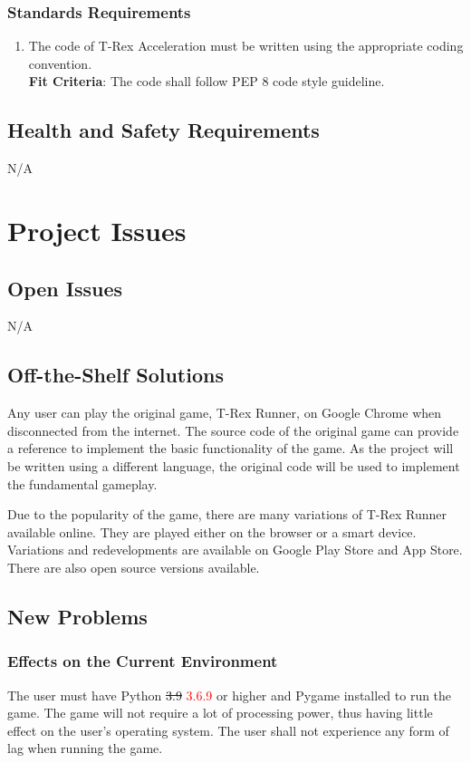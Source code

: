 \documentclass[12pt, titlepage]{article}
\begin{document}
\subsubsection{Standards Requirements}
\begin{enumerate}[leftmargin=1.20cm, label={LR \arabic*}]
    \item The code of T-Rex Acceleration must be written using the appropriate coding convention. \\
    \textbf{Fit Criteria}: The code shall follow PEP 8 code style guideline.
\end{enumerate}

\subsection{Health and Safety Requirements}
N/A

\section{Project Issues}
\subsection{Open Issues}
N/A

\subsection{Off-the-Shelf Solutions}
Any user can play the original game, T-Rex Runner, on Google Chrome when disconnected from the internet. The source code of the original game can provide a reference to implement the basic functionality of the game. As the project will be written using a different language, the original code will be used to implement the fundamental gameplay. 

Due to the popularity of the game, there are many variations of T-Rex Runner available online. They are played either on the browser or a smart device. Variations and redevelopments are available on Google Play Store and App Store. There are also open source versions available. 

\subsection{New Problems}
\subsubsection{Effects on the Current Environment}
The user must have Python \sout{3.9} \textcolor{red}{3.6.9} or higher and Pygame installed to run the game. The game will not require a lot of processing power, thus having little effect on the user's operating system. The user shall not experience any form of lag when running the game.
\end{document}
